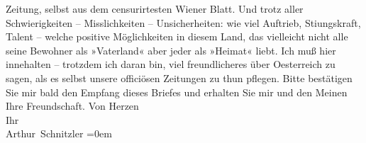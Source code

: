 \begin{ledgroupsized}[t]{13cm}
                    Zeitung, selbst aus dem censurirtesten Wiener
                    Blatt. Und trotz aller Schwierigkeiten – Misslichkeiten – Unsicherheiten: wie
                    viel Auftrieb, Sti{\geminationm}ungskraft, Talent – welche
                    positive Möglichkeiten in diesem Land, das vielleicht nicht {\pb}alle
                    seine Bewohner als »Vaterland« aber jeder als »Heimat« liebt. Ich muß hier
                    innehalten – trotzdem ich daran bin, viel freundlicheres über Oesterreich zu sagen, als es \introOben{}selbst\introOben{} unsere officiösen Zeitungen zu thun pflegen.\pend
           \pstart
           Bitte bestätigen Sie mir bald den Empfang dieses Briefes und erhalten Sie mir und
                    den Meinen Ihre Freundschaft.\pend
           \pstart
           Von Herzen{\\[\baselineskip]}Ihr{\\[\baselineskip]}\spacefill\mbox{Arthur Schnitzler}\pend
           \leftskip=0em{}          \endnumbering{}\end{ledgroupsized}  \newcommand{\dateiname}{L02292}\newcommand{\titel}{Arthur Schnitzler an Georg Brandes, 2. 8. 1918}\newcommand{\editorInnen}{Martin Anton Müller und Gerd-Hermann Susen}
      